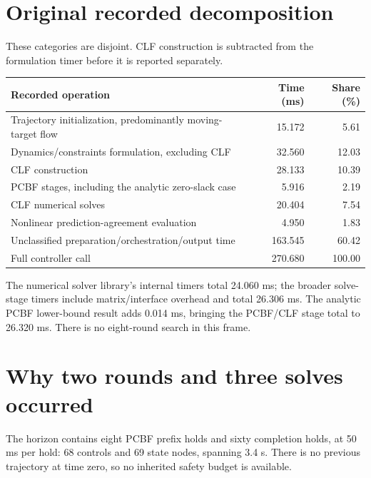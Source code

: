 \documentclass[11pt]{article}
\begin{document}
\section{Original recorded decomposition}
These categories are disjoint. CLF construction is subtracted from the
formulation timer before it is reported separately.
\begin{center}
\begin{tabular}{lrr}
\toprule
Recorded operation & Time (ms) & Share (\%) \\
\midrule
Trajectory initialization, predominantly moving-target flow & 15.172 & 5.61 \\
Dynamics/constraints formulation, excluding CLF & 32.560 & 12.03 \\
CLF construction & 28.133 & 10.39 \\
PCBF stages, including the analytic zero-slack case & 5.916 & 2.19 \\
CLF numerical solves & 20.404 & 7.54 \\
Nonlinear prediction-agreement evaluation & 4.950 & 1.83 \\
Unclassified preparation/orchestration/output time & 163.545 & 60.42 \\
\midrule
Full controller call & 270.680 & 100.00 \\
\bottomrule
\end{tabular}
\end{center}
The numerical solver library's internal timers total 24.060 ms; the broader
solve-stage timers include matrix/interface overhead and total 26.306 ms.
The analytic PCBF lower-bound result adds 0.014 ms, bringing the PCBF/CLF
stage total to 26.320 ms. There is no eight-round search in this frame.

\section{Why two rounds and three solves occurred}
The horizon contains eight PCBF prefix holds and sixty completion holds,
at 50 ms per hold: 68 controls and 69 state nodes, spanning 3.4 s.
There is no previous trajectory at time zero, so no inherited safety budget
is available.
\end{document}
